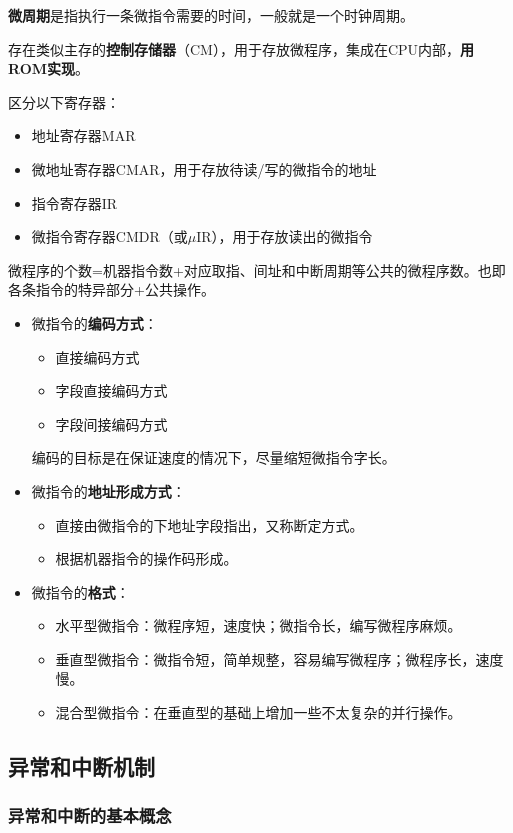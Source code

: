 \documentclass[12pt, a4paper, oneside]{ctexart}
\begin{document}
\textbf{微周期}是指执行一条微指令需要的时间，一般就是一个时钟周期。

存在类似主存的\textbf{控制存储器}（CM），用于存放微程序，集成在CPU内部，\textbf{用ROM实现}。

区分以下寄存器：
\begin{itemize}
  \item 地址寄存器MAR
  \item 微地址寄存器CMAR，用于存放待读/写的微指令的地址
  \item 指令寄存器IR
  \item 微指令寄存器CMDR（或$\mu$IR），用于存放读出的微指令
\end{itemize}

微程序的个数=机器指令数+对应取指、间址和中断周期等公共的微程序数。也即各条指令的特异部分+公共操作。

\begin{itemize}
  \item 微指令的\textbf{编码方式}：
  \begin{itemize}
    \item 直接编码方式
    \item 字段直接编码方式
    \item 字段间接编码方式
  \end{itemize}
  编码的目标是在保证速度的情况下，尽量缩短微指令字长。
  \item 微指令的\textbf{地址形成方式}：
  \begin{itemize}
    \item 直接由微指令的下地址字段指出，又称断定方式。
    \item 根据机器指令的操作码形成。
  \end{itemize}
  \item 微指令的\textbf{格式}：
  \begin{itemize}
    \item 水平型微指令：微程序短，速度快；微指令长，编写微程序麻烦。
    \item 垂直型微指令：微指令短，简单规整，容易编写微程序；微程序长，速度慢。
    \item 混合型微指令：在垂直型的基础上增加一些不太复杂的并行操作。
  \end{itemize}
\end{itemize}

\subsection{异常和中断机制}

\subsubsection{异常和中断的基本概念}
\end{document}
